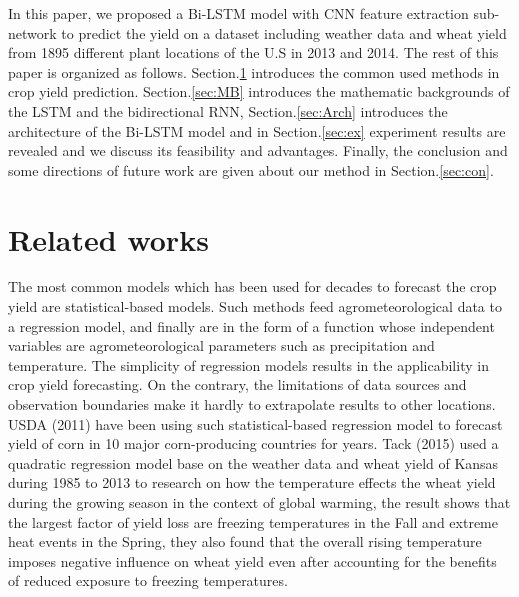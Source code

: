 \documentclass[conference, a4paper]{IEEEtran}
\begin{document}
  In this paper, we proposed a Bi-LSTM model with CNN feature extraction sub-network to predict the yield on a dataset including weather data and wheat yield from 1895 different plant locations of the U.S in 2013 and 2014. The rest of this paper is organized as follows. Section.\ref{sec:RW} introduces the common used methods in crop yield prediction. Section.\ref{sec:MB} introduces the mathematic backgrounds of the LSTM and the bidirectional RNN, Section.\ref{sec:Arch} introduces the architecture of the Bi-LSTM model and in Section.\ref{sec:ex} experiment results are revealed and we discuss its feasibility and advantages. Finally, the conclusion and some directions of future work are given about our method in Section.\ref{sec:con}.

\section{Related works} \label{sec:RW}

  The most common models which has been used for decades to forecast the crop yield are statistical-based models. Such methods feed agrometeorological data to a regression model, and finally are in the form of a function whose independent variables are agrometeorological parameters such as precipitation and temperature. The simplicity of regression models results in the applicability in crop yield forecasting. On the contrary, the limitations of data sources and observation boundaries make it hardly to extrapolate results to other locations. USDA (2011) \cite{goodUSDACornSoybean2011} have been using such statistical-based regression model to forecast yield of corn in 10 major corn-producing countries for years. Tack (2015)\cite{tackEffectWarmingTemperatures2015} used a quadratic regression model base on the weather data and wheat yield of Kansas during 1985 to 2013 to research on how the temperature effects the wheat yield during the growing season in the context of global warming, the result shows that the largest factor of yield loss are freezing temperatures in the Fall and extreme heat events in the Spring, they also found that the overall rising temperature imposes negative influence on wheat yield even after accounting for the benefits of reduced exposure to freezing temperatures. 
\end{document}
